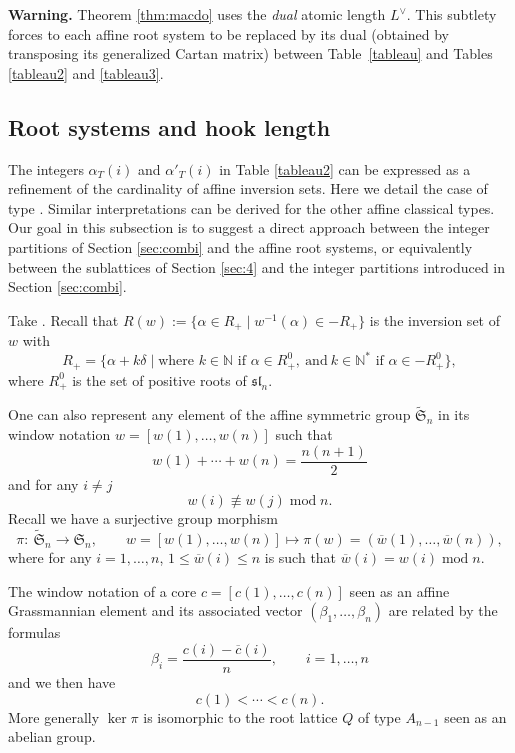 \documentclass[pdftex]{sigma}
\numberwithin{equation}{section}
\newcommand{\N}{\mathbb{N}}
\newcommand{\func}[1]{\operatorname{#1}}
\begin{document}
 \textbf{Warning.} Theorem \ref{thm:macdo} uses the \textit{dual} atomic length $L^{\vee}$. This subtlety forces to each affine root system to be replaced by its dual (obtained by transposing its generalized Cartan matrix) between Table~\ref{tableau} and Tables \ref{tableau2} and \ref{tableau3}.

\subsection{Root systems and hook length}

The integers $\alpha_T(i)$ and $\alpha'_T(i)$ in Table \ref{tableau2} can be expressed as a refinement of the cardinality of affine inversion sets. Here we detail the case of type . Similar interpretations can be derived for the other affine classical types. Our goal in this subsection is to suggest a direct approach between the integer partitions of Section \ref{sec:combi} and the affine root systems, or equivalently between the sublattices of Section \ref{sec:4} and the integer partitions introduced in Section \ref{sec:combi}.

Take . Recall that $R(w):=\big\lbrace\alpha\in R_+\mid w^{-1}(\alpha)\in-R_+\bigr\rbrace$ is the inversion set of $w$ with{\samepage
\[R_+=\bigl\lbrace \alpha+k\delta\mid \text{where } k\in \N \text{ if } \alpha\in R_+^{0},  \ \text{and} \
k\in \N^* \text{ if } \alpha\in -R_+^{0}\bigr\rbrace,\]
where $R_+^{0}$ is the set of positive roots of $\mathfrak{sl}_n$.}

One can also represent any element of the affine symmetric group $\widetilde{\mathfrak{S}}_{n}$ in its window notation $w=[w(1),\dots ,w(n)]$ such that%
\begin{equation*}
w(1)+\cdots +w(n)=\frac{n(n+1)}{2}
\end{equation*}%
and for any $i\neq j$%
\begin{equation*}
w(i)\not\equiv w(j)\func{mod}n.
\end{equation*}%
Recall we have a surjective group morphism%
\begin{equation*}
\pi \colon \
\widetilde{\mathfrak{S}}_{n}\rightarrow \mathfrak{S}_{n} ,\qquad
w=[w(1),\dots ,w(n)]\mapsto \pi (w)=(\overline{w}(1),\dots ,\overline{w}%
(n)),
\end{equation*}
where for any $i=1,\dots ,n$, $1\leq \overline{w}(i)\leq n$ is such that $%
\overline{w}(i)=w(i)\func{mod}n$.


The window notation of a core $c=[c(1),\dots ,c(n)]$ seen as an affine
Grassmannian element and its associated vector $(\beta _{1},\dots ,\beta
_{n})$ are related by the formulas%
\begin{equation*}
\beta _{i}=\frac{c(i)-\overline{c}(i)}{n},\qquad i=1,\dots ,n
\end{equation*}%
and we then have
\begin{equation*}
c(1)<\cdots <c(n).
\end{equation*}%
More generally $\ker \pi $ is isomorphic to the root lattice $Q$ of type $%
A_{n-1}$ seen as an abelian group.
\end{document}

